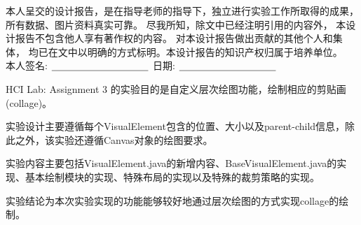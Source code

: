


\newpage
\thispagestyle{empty}
\vspace*{20pt}
\begin{center}{}\end{center}
\par\vspace*{30pt}
\renewcommand{\baselinestretch}{2}

{%

本人呈交的设计报告，是在指导老师的指导下，独立进行实验工作所取得的成果，
所有数据、图片资料真实可靠。 尽我所知，除文中已经注明引用的内容外，
本设计报告不包含他人享有著作权的内容。
对本设计报告做出贡献的其他个人和集体，
均已在文中以明确的方式标明。本设计报告的知识产权归属于培养单位。\\[2cm]

\hspace*{1cm}本人签名: $\underline{\hspace{3.5cm}}$
\hspace{2cm}日期: $\underline{\hspace{3.5cm}}$\hfill\par}
\baselineskip=23pt  %





\begin{cnabstract}
\thispagestyle{empty}

HCI Lab: Assignment 3 的实验目的是自定义层次绘图功能，绘制相应的剪贴画(collage)。

实验设计主要遵循每个VisualElement包含的位置、大小以及parent-child信息，除此之外，该实验还遵循Canvas对象的绘图要求。

实验内容主要包括VisualElement.java的新增内容、BaseVisualElement.java的实现、基本绘制模块的实现、特殊布局的实现以及特殊的裁剪策略的实现。

实验结论为本次实验实现的功能能够较好地通过层次绘图的方式实现collage的绘制。


\end{cnabstract}
\par
\vspace*{2em}





